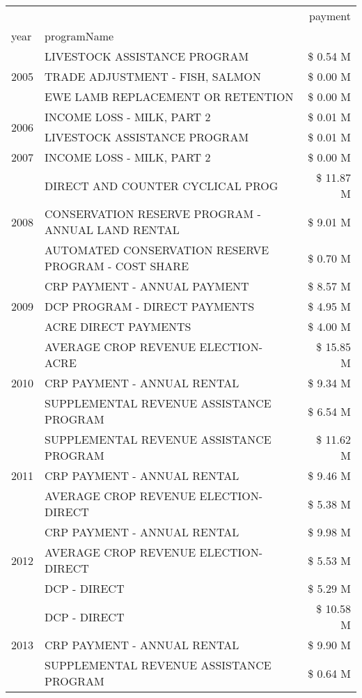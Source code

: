 \begin{tabular}{llr}
\toprule
 &  & payment \\
year & programName &  \\
\midrule
\multirow[t]{3}{*}{2005} & LIVESTOCK ASSISTANCE PROGRAM & \$ 0.54 M \\
 & TRADE ADJUSTMENT - FISH, SALMON & \$ 0.00 M \\
 & EWE LAMB REPLACEMENT OR RETENTION & \$ 0.00 M \\
\cline{1-3}
\multirow[t]{2}{*}{2006} & INCOME LOSS - MILK, PART 2 & \$ 0.01 M \\
 & LIVESTOCK ASSISTANCE PROGRAM & \$ 0.01 M \\
\cline{1-3}
2007 & INCOME LOSS - MILK, PART 2 & \$ 0.00 M \\
\cline{1-3}
\multirow[t]{3}{*}{2008} & DIRECT AND COUNTER CYCLICAL PROG & \$ 11.87 M \\
 & CONSERVATION RESERVE PROGRAM - ANNUAL LAND RENTAL & \$ 9.01 M \\
 & AUTOMATED CONSERVATION RESERVE PROGRAM - COST SHARE & \$ 0.70 M \\
\cline{1-3}
\multirow[t]{3}{*}{2009} & CRP PAYMENT - ANNUAL PAYMENT & \$ 8.57 M \\
 & DCP PROGRAM - DIRECT PAYMENTS & \$ 4.95 M \\
 & ACRE DIRECT PAYMENTS & \$ 4.00 M \\
\cline{1-3}
\multirow[t]{3}{*}{2010} & AVERAGE CROP REVENUE ELECTION-ACRE & \$ 15.85 M \\
 & CRP PAYMENT - ANNUAL RENTAL & \$ 9.34 M \\
 & SUPPLEMENTAL REVENUE ASSISTANCE PROGRAM & \$ 6.54 M \\
\cline{1-3}
\multirow[t]{3}{*}{2011} & SUPPLEMENTAL REVENUE ASSISTANCE PROGRAM & \$ 11.62 M \\
 & CRP PAYMENT - ANNUAL RENTAL & \$ 9.46 M \\
 & AVERAGE CROP REVENUE ELECTION-DIRECT & \$ 5.38 M \\
\cline{1-3}
\multirow[t]{3}{*}{2012} & CRP PAYMENT - ANNUAL RENTAL & \$ 9.98 M \\
 & AVERAGE CROP REVENUE ELECTION-DIRECT & \$ 5.53 M \\
 & DCP - DIRECT & \$ 5.29 M \\
\cline{1-3}
\multirow[t]{3}{*}{2013} & DCP - DIRECT & \$ 10.58 M \\
 & CRP PAYMENT - ANNUAL RENTAL & \$ 9.90 M \\
 & SUPPLEMENTAL REVENUE ASSISTANCE PROGRAM & \$ 0.64 M \\

\end{tabular}
